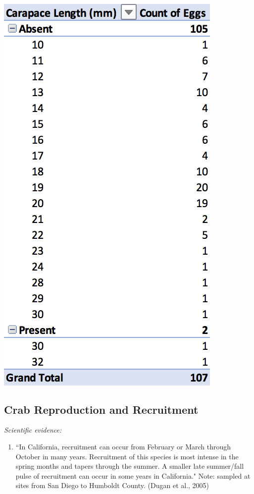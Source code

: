\documentclass[11pt]{article}
\begin{document}
\paragraph{}
\centerline{\includegraphics[scale=0.5]{PivotTable_Eggs}}

\subsection{Crab Reproduction and Recruitment}
{\it Scientific evidence:}
\begin{enumerate}
	\item ``In California, recruitment can occur from February or March through October in many years. Recruitment of this species is most intense in the spring months and tapers through the summer. A smaller late summer/fall pulse of recruitment can occur in some years in California." Note: sampled at sites from San Diego to Humboldt County. (Dugan et al., 2005)
\end{enumerate}
\end{document}
